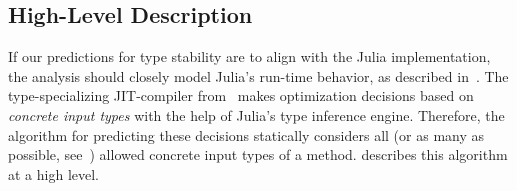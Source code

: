 \subsection{High-Level Description}
\label{ssec:algo:high}

If our predictions for type stability are to align with the Julia
implementation, the analysis should closely model Julia's run-time behavior,
as described in~. The type-specializing JIT-compiler
from~ makes optimization decisions based on \emph{concrete
  input types} with the help of Julia's type inference engine. 
Therefore, the algorithm for
predicting these decisions statically considers all (or as many as possible,
see~) allowed concrete input types of a method.
 describes this algorithm at a high level.



